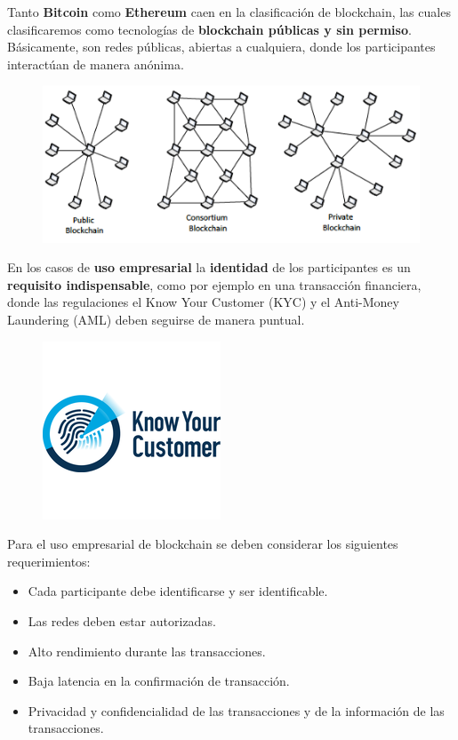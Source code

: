 \documentclass{beamer}
\begin{document}
	\begin{frame}
		Tanto \textbf{Bitcoin} como \textbf{Ethereum} caen en la clasificación de blockchain, las cuales clasificaremos como tecnologías de \textbf{blockchain públicas y sin permiso}. Básicamente, son redes públicas, abiertas a cualquiera, donde los participantes interactúan de manera anónima.
		\begin{figure}[h]
			\includegraphics[scale=.7]{types_block}
			\centering
		\end{figure}
	\end{frame}

	\begin{frame}
		En los casos de \textbf{uso empresarial} la \textbf{identidad} de los participantes es un \textbf{requisito indispensable}, como por ejemplo en una transacción financiera, donde las regulaciones el Know Your Customer (KYC) y el Anti-Money Laundering (AML) deben seguirse de manera puntual.
		\begin{figure}[h]
			\includegraphics[scale=.5]{kyc_logo}
			\centering
		\end{figure}
	\end{frame}
	
	\begin{frame}
		Para el uso empresarial de blockchain se deben considerar los siguientes requerimientos:
		
		\begin{itemize}
			\item Cada participante debe identificarse y ser identificable.
			\item Las redes deben estar autorizadas.
			\item Alto rendimiento durante las transacciones.
			\item Baja latencia en la confirmación de transacción.
			\item Privacidad y confidencialidad de las transacciones y de la información de las transacciones.
		\end{itemize}
	\end{frame}
\end{document}
